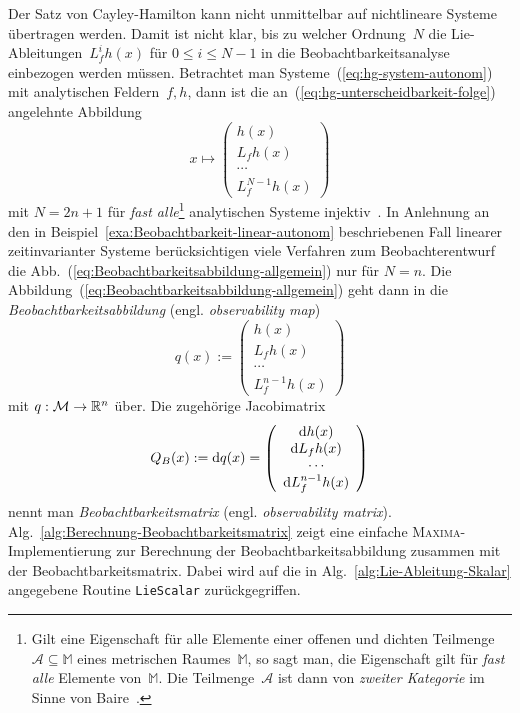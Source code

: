 Der Satz von Cayley-Hamilton kann
nicht unmittelbar auf nichtlineare Systeme übertragen werden. Damit
ist nicht klar, bis zu welcher Ordnung~$N$ die Lie-Ableitungen~$L_{f}^{i}h(x)$
für $0\leq i\leq N-1$ in die Beobachtbarkeitsanalyse einbezogen werden
müssen. Betrachtet man Systeme~(\ref{eq:hg-system-autonom}) mit
analytischen Feldern~$f,h$, dann ist die an~(\ref{eq:hg-unterscheidbarkeit-folge})
angelehnte Abbildung 
\begin{equation}
x\mapsto\left(\begin{array}{c}
h(x)\\
L_{f}h(x)\\
\cdots\\
L_{f}^{N-1}h(x)
\end{array}\right)\label{eq:Beobachtbarkeitsabbildung-allgemein}
\end{equation}
mit $N=2n+1$ für \textit{fast alle}\footnote{Gilt eine Eigenschaft für alle Elemente einer offenen und dichten
Teilmenge $\mathcal{A}\subseteq\mathbb{M}$ eines metrischen Raumes~$\mathbb{M}$,
so sagt man, die Eigenschaft gilt für \emph{fast alle} Elemente von~$\mathbb{M}$.
Die Teilmenge~$\mathcal{A}$ ist dann von \emph{zweiter Kategorie}
im Sinne von Baire~\cite{goepfert2009}.} analytischen Systeme injektiv~\cite{gauthier91}. In Anlehnung an
den in Beispiel~\ref{exa:Beobachtbarkeit-linear-autonom} beschriebenen
Fall linearer zeitinvarianter Systeme berücksichtigen viele Verfahren
zum Beobachterentwurf die Abb.~(\ref{eq:Beobachtbarkeitsabbildung-allgemein})
nur für $N=n$. Die Abbildung~(\ref{eq:Beobachtbarkeitsabbildung-allgemein})
geht dann in die \emph{Beobachtbarkeitsabbildung}
(engl. \emph{observability map}) 
\begin{equation}
q(x):=\left(\begin{array}{c}
h(x)\\
L_{f}h(x)\\
\cdots\\
L_{f}^{n-1}h(x)
\end{array}\right)\label{eq:Beobachtbarkeitsabbildung}
\end{equation}
mit $q:\mathcal{M}\to{\mathbb{R}}^{n}$ über. Die zugehörige Jacobimatrix 
\begin{equation}
Q_{B}(x):={\mathrm{d}} q(x)=\left(\begin{array}{c}
{\mathrm{d}} h(x)\\
{\mathrm{d}} L_{f}h(x)\\
\cdots\\
{\mathrm{d}} L_{f}^{n-1}h(x)
\end{array}\right)\label{eq:Beobachtbarkeitsmatrix}
\end{equation}
nennt man \emph{Beobachtbarkeitsmatrix}
(engl. \emph{observability matrix}). Alg.~\ref{alg:Berechnung-Beobachtbarkeitsmatrix}
zeigt eine einfache \textsc{Maxima}-Implementierung zur Berechnung
der Beobachtbarkeitsabbildung zusammen mit der Beobachtbarkeitsmatrix.
Dabei wird auf die in Alg.~\ref{alg:Lie-Ableitung-Skalar} angegebene
Routine \texttt{LieScalar} zurückgegriffen.


